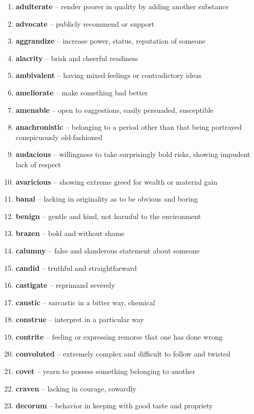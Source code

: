 \begin{enumerate}[wide,labelindent=0pt]
\item \textbf{adulterate} -- render poorer in quality by adding another substance
\item \textbf{advocate} -- publicly recommend or support
\item \textbf{aggrandize} -- increase power, status, reputation of someone
\item \textbf{alacrity} -- brisk and cheerful readiness
\item \textbf{ambivalent} -- having mixed feelings or contradictory ideas
\item \textbf{ameliorate} -- make something bad better
\item \textbf{amenable} -- open to suggestions, easily persuaded, susceptible
\item \textbf{anachronistic} -- belonging to a period other than that being portrayed conspicuously old-fashioned
\item \textbf{audacious} -- willingness to take surprisingly bold risks, showing impudent lack of respect
\item \textbf{avaricious} -- showing extreme greed for wealth or material gain
\item \textbf{banal} -- lacking in originality as to be obvious and boring
\item \textbf{benign} -- gentle and kind, not harmful to the environment
\item \textbf{brazen} -- bold and without shame
\item \textbf{calumny} -- false and slanderous statement about someone
\item \textbf{candid} -- truthful and straightforward
\item \textbf{castigate} -- reprimand severely
\item \textbf{caustic} -- sarcastic in a bitter way, chemical
\item \textbf{construe} -- interpret in a particular way
\item \textbf{contrite} -- feeling or expressing remorse that one has done wrong
\item \textbf{convoluted} -- extremely complex and difficult to follow and twisted
\item \textbf{covet} -- yearn to possess something belonging to another
\item \textbf{craven} -- lacking in courage, cowardly
\item \textbf{decorum} -- behavior in keeping with good taste and propriety

\end{enumerate}
